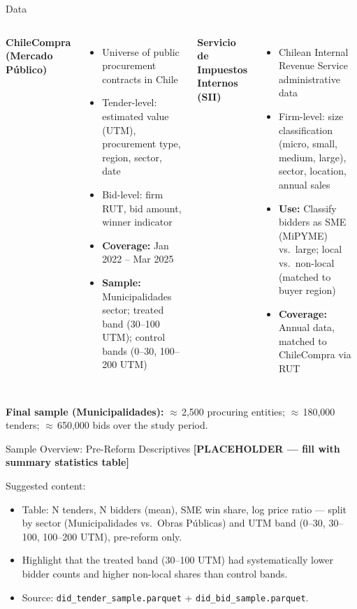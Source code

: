 \documentclass[9pt,aspectratio=169]{beamer}
\begin{document}
\begin{frame}{Data}
\begin{columns}[T]
  \textbf{ChileCompra (Mercado Público)}
  \begin{itemize}
    \item Universe of public procurement contracts in Chile
    \item Tender-level: estimated value (UTM), procurement type,
          region, sector, date
    \item Bid-level: firm RUT, bid amount, winner indicator
    \item \textbf{Coverage:} Jan 2022 -- Mar 2025
    \item \textbf{Sample:} Municipalidades sector;
          treated band (30--100 UTM);
          control bands (0--30, 100--200 UTM)
  \end{itemize}

  \textbf{Servicio de Impuestos Internos (SII)}
  \begin{itemize}
    \item Chilean Internal Revenue Service administrative data
    \item Firm-level: size classification (micro, small, medium, large),
          sector, location, annual sales
    \item \textbf{Use:} Classify bidders as SME (MiPYME) vs.\ large;
          local vs.\ non-local (matched to buyer region)
    \item \textbf{Coverage:} Annual data, matched to ChileCompra via RUT
  \end{itemize}
\end{columns}

\bigskip
\textbf{Final sample (Municipalidades):} $\approx$\,2,500 procuring entities;
$\approx$\,180,000 tenders; $\approx$\,650,000 bids over the study period.
\end{frame}

\begin{frame}{Sample Overview: Pre-Reform Descriptives}
\textbf{[PLACEHOLDER — fill with summary statistics table]}

\medskip
Suggested content:
\begin{itemize}
  \item Table: N tenders, N bidders (mean), SME win share, log price ratio
        --- split by sector (Municipalidades vs.\ Obras Públicas) and UTM band
        (0--30, 30--100, 100--200 UTM), pre-reform only.
  \item Highlight that the treated band (30--100 UTM) had systematically
        lower bidder counts and higher non-local shares than control bands.
  \item Source: \texttt{did\_tender\_sample.parquet} + \texttt{did\_bid\_sample.parquet}.
\end{itemize}
\end{frame}
\end{document}
